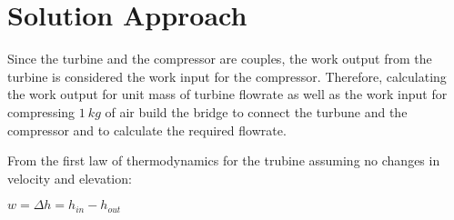 \documentclass[letterpaper,10pt,english]{jupyterBook}
\begin{document}
\sphinxAtStartPar
{}


\section{Solution Approach}
\label{\detokenize{notebooks/Chapter5/CH5-Q3:solution-approach}}
\sphinxAtStartPar
Since the turbine and the compressor are couples, the work output from the turbine is considered the work input for the compressor. Therefore, calculating the work output for unit mass of turbine flow\sphinxhyphen{}rate as well as the work input for compressing \(1\:kg\) of air build the bridge to connect the turbune and the compressor and to calculate the required flow\sphinxhyphen{}rate.

\sphinxAtStartPar
From the first law of thermodynamics for the trubine assuming no changes in velocity and elevation:

\sphinxAtStartPar
\(w=\Delta h=h_{in}-h_{out}\)
\end{document}
